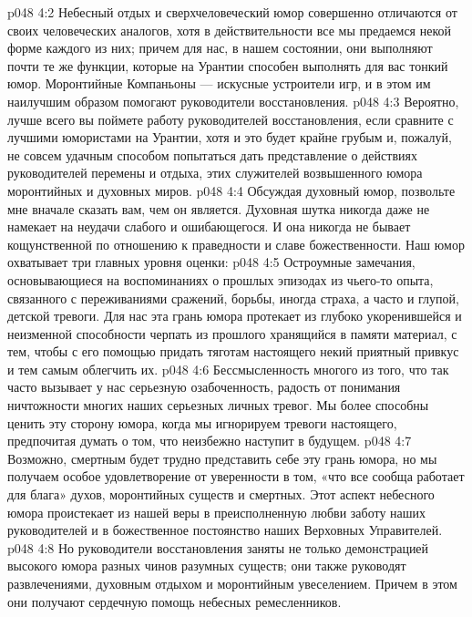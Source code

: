 \vs p048 4:2 Небесный отдых и сверхчеловеческий юмор совершенно отличаются от своих человеческих аналогов, хотя в действительности все мы предаемся некой форме каждого из них; причем для нас, в нашем состоянии, они выполняют почти те же функции, которые на Урантии способен выполнять для вас тонкий юмор. Моронтийные Компаньоны --- искусные устроители игр, и в этом им наилучшим образом помогают руководители восстановления.
\vs p048 4:3 Вероятно, лучше всего вы поймете работу руководителей восстановления, если сравните с лучшими юмористами на Урантии, хотя и это будет крайне грубым и, пожалуй, не совсем удачным способом попытаться дать представление о действиях руководителей перемены и отдыха, этих служителей возвышенного юмора моронтийных и духовных миров.
\vs p048 4:4 \pc Обсуждая духовный юмор, позвольте мне вначале сказать вам, чем он  является. Духовная шутка никогда даже не намекает на неудачи слабого и ошибающегося. И она никогда не бывает кощунственной по отношению к праведности и славе божественности. Наш юмор охватывает три главных уровня оценки:
\vs p048 4:5 \bibnobreakspace {} Остроумные замечания, основывающиеся на воспоминаниях о прошлых эпизодах из чьего\hyp{}то опыта, связанного с переживаниями сражений, борьбы, иногда страха, а часто и глупой, детской тревоги. Для нас эта грань юмора протекает из глубоко укоренившейся и неизменной способности черпать из прошлого хранящийся в памяти материал, с тем, чтобы с его помощью придать тяготам настоящего некий приятный привкус и тем самым облегчить их.
\vs p048 4:6 \bibnobreakspace {} Бессмысленность многого из того, что так часто вызывает у нас серьезную озабоченность, радость от понимания ничтожности многих наших серьезных личных тревог. Мы более способны ценить эту сторону юмора, когда мы игнорируем тревоги настоящего, предпочитая думать о том, что неизбежно наступит в будущем.
\vs p048 4:7 \bibnobreakspace {} Возможно, смертным будет трудно представить себе эту грань юмора, но мы получаем особое удовлетворение от уверенности в том, «что все сообща работает для блага» духов, моронтийных существ и смертных. Этот аспект небесного юмора проистекает из нашей веры в преисполненную любви заботу наших руководителей и в божественное постоянство наших Верховных Управителей.
\vs p048 4:8 \pc Но руководители восстановления заняты не только демонстрацией высокого юмора разных чинов разумных существ; они также руководят развлечениями, духовным отдыхом и моронтийным увеселением. Причем в этом они получают сердечную помощь небесных ремесленников.
